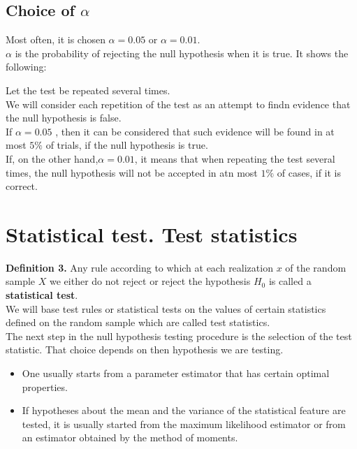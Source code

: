 \documentclass[a4paper, 12pt]{article}
\begin{document}
\subsection{Choice of $\alpha$}
Most often, it is chosen $\alpha = 0.05$ or $\alpha = 0.01$.\\

$\alpha$ is the probability of rejecting the null hypothesis when it is
true. It shows the following:


Let the test be repeated several times.\\

We will consider each repetition of the test as an attempt to findn evidence that the null hypothesis is false.\\

If $\alpha = 0.05$ , then it can be considered that such evidence will be found in at most $5\%$ of trials, if the null hypothesis is true.\\

If, on the other hand,$\alpha = 0.01$, it means that when repeating the test several times, the null hypothesis will not be accepted in atn most $1\%$ of cases, if it is correct.\\


\section{Statistical test. Test statistics}

\textbf{Definition 3.} Any rule according to which at each realization $x$
of the random sample $X$ we either do not reject or reject the
hypothesis $H_0$ is called a \textbf{statistical test}.\\

We will base test rules or statistical tests on the values of certain statistics defined on the random sample which are called test statistics.\\


The next step in the null hypothesis testing procedure is the selection of the test statistic. That choice depends on then hypothesis we are testing.

\begin{itemize}
  \item One usually starts from a parameter estimator that has certain optimal
properties.
\item If hypotheses about the mean and the variance of the statistical feature are tested, it is usually started from the maximum likelihood estimator or from an estimator obtained by the method of moments.
\end{itemize}
\end{document}
